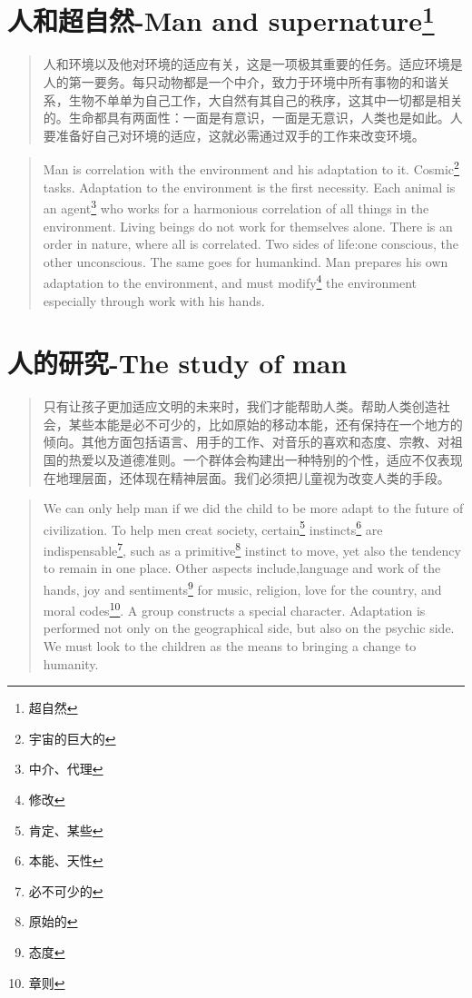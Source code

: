 \documentclass[lang=cn,10pt]{elegantbook}
\begin{document}
\chapter{人和超自然-Man and supernature\footnote{超自然}}

\begin{quote}
{\small 人和环境以及他对环境的适应有关，这是一项极其重要的任务。适应环境是人的第一要务。每只动物都是一个中介，致力于环境中所有事物的和谐关系，生物不单单为自己工作，大自然有其自己的秩序，这其中一切都是相关的。生命都具有两面性：一面是有意识，一面是无意识，人类也是如此。人要准备好自己对环境的适应，这就必需通过双手的工作来改变环境。}
\end{quote}

\begin{tcolorbox}
\begin{quote}
{\small Man is correlation with the environment and his adaptation to it. Cosmic\footnote{宇宙的巨大的} tasks. Adaptation to the environment is the first necessity. Each animal is an agent\footnote{中介、代理} who works for a harmonious correlation of all things in the environment. Living beings do not work for themselves alone. There is an order in nature, where all is correlated. Two sides of life:one conscious, the other unconscious. The same goes for humankind. Man prepares his own adaptation to the environment, and must modify\footnote{修改} the environment especially through work with his hands.}
\end{quote}
\end{tcolorbox}

\chapter{人的研究-The study of man}

\begin{quote}
{\small 只有让孩子更加适应文明的未来时，我们才能帮助人类。帮助人类创造社会，某些本能是必不可少的，比如原始的移动本能，还有保持在一个地方的倾向。其他方面包括语言、用手的工作、对音乐的喜欢和态度、宗教、对祖国的热爱以及道德准则。一个群体会构建出一种特别的个性，适应不仅表现在地理层面，还体现在精神层面。我们必须把儿童视为改变人类的手段。}
\end{quote}

\begin{tcolorbox}
\begin{quote}
{\small We can only help man if we did the child to be more adapt to the future of civilization. To help men creat society, certain\footnote{肯定、某些} instincts\footnote{本能、天性} are indispensable\footnote{必不可少的}, such as a primitive\footnote{原始的} instinct to move, yet also the tendency to remain in one place. Other aspects include,language and work of the hands, joy and sentiments\footnote{态度} for music, religion, love for the country, and moral codes\footnote{章则}. A group constructs a special character. Adaptation is performed not only on the geographical side, but also on the psychic side. We must look to the children as the means to bringing a change to humanity.}
\end{quote}
\end{tcolorbox}
\end{document}
